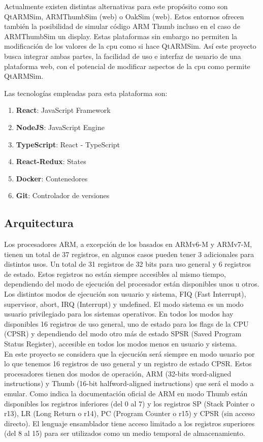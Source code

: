 {    Actualmente existen distintas alternativas para este propósito como son QtARMSim, ARMThumbSim (web) o OakSim (web).
    Estos entornos ofrecen también la posibilidad de simular código ARM Thumb incluso en el caso de ARMThumbSim un display.
    Estas plataformas sin embargo no permiten la modificación de los valores de la cpu como si hace QtARMSim. Así este proyecto busca integrar ambas partes, la facilidad de uso e interfaz de usuario de una plataforma web, con
    el potencial de modificar aspectos de la cpu como permite QtARMSim. 

    Las tecnologías empleadas para esta plataforma son:
    \begin{enumerate}
        \item \textbf{React}: JavaScript Framework
        \item \textbf{NodeJS}: JavaScript Engine
        \item \textbf{TypeScript}: React - TypeScript
        \item \textbf{React-Redux}: States
        \item \textbf{Docker}: Contenedores
        \item \textbf{Git}: Controlador de versiones
    \end{enumerate}

    \subsection{Arquitectura}
    Los procesadores ARM, a excepción  de los basados en ARMv6-M y ARMv7-M, tienen un total de 37 registros, en algunos casos pueden tener 3 adicionales para distintos usos.
    Un total de 31 registros de 32 bits para uso general y 6 registros de estado. Estos registros no están siempre accesibles al mismo tiempo, dependiendo del modo de ejecución del procesador están disponibles unos u otros.
    Los distintos modos de ejecución son usuario y sistema, FIQ (Fast Interrupt), supervisor, abort, IRQ (Interrupt) y undefined.
    El modo sistema es un modo usuario privilegiado para los sistemas operativos.
    En todos los modos hay disponibles 16 registros de uso general, uno de estado para los flags de la CPU (CPSR) y dependiendo del modo otro más de estado SPSR (Saved Program Status Register), accesible en todos los modos menos en usuario y sistema. \\
    \clearpage
    En este proyecto se considera que la ejecución será siempre en modo usuario por lo que tenemos 16 registros de uso general y un registro de estado CPSR.
    Estos procesadores tienen dos modos de operación, ARM (32-bits word-aligned instructions) y Thumb (16-bit halfword-aligned instructions) que será el modo a emular.
    Como indica la documentación oficial de ARM  en modo Thumb están disponibles los registros inferiores (del 0 al 7) y los registros SP (Stack Pointer o r13), LR (Long Return o r14), PC (Program Counter o r15) y CPSR (sin acceso directo).
    El lenguaje ensamblador tiene acceso limitado a los registros superiores (del 8 al 15) para ser utilizados como un medio temporal de almacenamiento.

}
